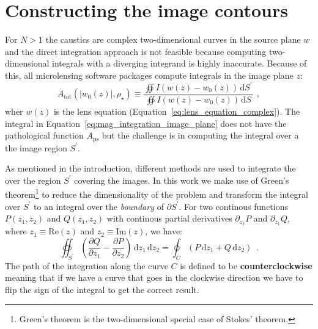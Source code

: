 \documentclass[12pt,dvipsnames]{report}
\newcommand{\ud}{\,\mathrm{d}}
\newcommand{\hquad}{~~}
\begin{document}
\section{Constructing the image contours}

For $N>1$ the caustics are complex two-dimensional curves in the source plane
$w$ and the direct integration approach is not feasible because computing
two-dimensional integrals with a diverging integrand is highly inaccurate.
Because of this, all microlensing software packages compute integrals in the
image plane $z$:
\begin{equation}
    A_\mathrm{tot}(|w_0(z)|,\rho_\star)\equiv \frac{\oiint I(w(z) - w_0(z))\ud S^\prime}{
        \oiint I(w(z) - w_0(z))\ud S}\hquad,
    \label{eq:mag_integration_image_plane}
\end{equation}
wher $w(z)$ is the lens equation (Equation~\ref{eq:lens_equation_complex}).
The integral in Equation~\ref{eq:mag_integration_image_plane} does not have the
pathological function $A_\mathrm{ps}$ but the challenge is in computing the
integral over a the image region $S^\prime$.

As mentioned in the introduction, different methods are used to integrate the
over the region $S^\prime$ covering the images. In this work we make use of
Green's theorem\footnote{Green's theorem is the two-dimensional special case of
    Stokes' theorem.} to reduce the dimensionality of the problem and transform the
integral over $S^\prime$ to an integral over the \emph{boundary} of $\partial S^\prime$. For two continous functions $P(z_1, z_2)$ and $Q(z_1, z_2)$
with continous partial derivatives $\partial_{z_2}P$ and $\partial_{z_1}Q$, where $z_1\equiv\mathrm{Re}(z)$ and $z_2\equiv\mathrm{Im}(z)$, we
have:
\begin{equation}
    \oiint_{{S}^\prime}\left(\frac{\partial Q}{\partial z_{1}}-\frac{\partial P}{\partial z_{2}} \right) \ud z_{1} \ud z_{2}= \oint_{C} (P \ud z_{1}+Q \ud
    z_{2})\hquad . \label{eq:green_theorem}
\end{equation}
The path of the integration along the curve $C$ is defined to be
\textbf{counterclockwise} meaning that if we have a curve that goes in the clockwise
direction we have to flip the sign of the integral to get the correct result.
\end{document}
